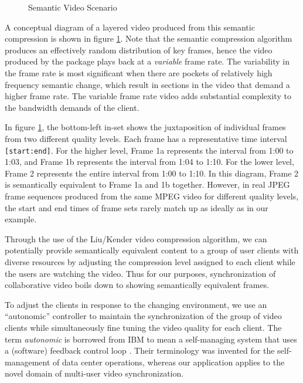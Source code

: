 \documentclass{sig-alternate}
\begin{document}
\begin{figure}
  \centering
  \caption{Semantic Video Scenario}
  \label{sem_video}
\end{figure} 

A conceptual diagram of a layered video produced from this semantic
compression is shown in figure \ref{sem_video}.  Note that the
semantic compression algorithm produces an effectively random
distribution of key frames, hence the video produced by the package
plays back at a {\em variable} frame rate.  The variability in the
frame rate is most significant when there are pockets of relatively
high frequency semantic change, which result in sections in the video
that demand a higher frame rate.  The variable frame rate video adds
substantial complexity to the bandwidth demands of the client.

In figure \ref{sem_video}, the bottom-left in-set shows the
juxtaposition of individual frames from two different quality levels.
Each frame has a representative time interval \texttt{[start:end]}.
For the higher level, Frame 1a represents the interval from 1:00 to
1:03, and Frame 1b represents the interval from 1:04 to 1:10.  For the
lower level, Frame 2 represents the entire interval from 1:00 to 1:10.
In this diagram, Frame 2 is semantically equivalent to Frame 1a and 1b
together.  However, in real JPEG frame sequences produced from the
same MPEG video for different quality levels, the start and end times
of frame sets rarely match up as ideally as in our example.

Through the use of the Liu/Kender video compression algorithm, we can
potentially provide semantically equivalent content to a group of user
clients with diverse resources by adjusting the compression level
assigned to each client while the users are watching the video.  Thus
for our purposes, synchronization of collaborative video boils down to
showing semantically equivalent frames.

To adjust the clients in response to the changing environment, we use
an ``autonomic'' controller to maintain the synchronization of the
group of video clients while simultaneously fine tuning the video
quality for each client.  The term \textit{autonomic} is borrowed from
IBM to mean a self-managing system that uses a (software) feedback
control loop \cite{IBM}.  Their terminology was invented for the
self-management of data center operations, whereas our application
applies to the novel domain of multi-user video synchronization.
\end{document}
